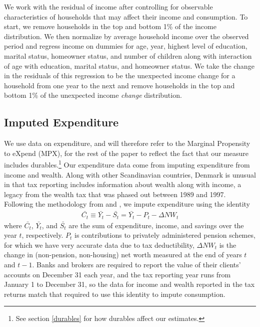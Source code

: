 \documentclass[titlepage]{\econtex}\newcommand{\texname}{ConsumptionHeterogeneity}
\begin{document}
	
	
	We work with the residual of income after controlling for observable characteristics of households that may affect their income and consumption. To start, we remove households in the top and bottom 1\% of the income distribution. We then normalize by average household income over the observed period and regress income on dummies for age, year, highest level of education, marital status, homeowner status, and number of children along with interaction of age with education, marital status, and homeowner status. We take the change in the residuals of this regression to be the unexpected income change for a household from one year to the next and remove households in the top and bottom 1\% of the unexpected income \textit{change} distribution.
	
	\subsection{Imputed Expenditure} \label{cons_imputation}
	We use data on expenditure, and will therefore refer to the Marginal Propensity to eXpend (MPX), for the rest of the paper to reflect the fact that our measure includes durables.\footnote{See section \ref{durables} for how durables affect our estimates.} Our expenditure data come from imputing expenditure from income and wealth. Along with other Scandinavian countries, Denmark is unusual in that tax reporting includes information about wealth along with income, a legacy from the wealth tax that was phased out between 1989 and 1997. Following the methodology from \cite{browning_imputing_2003} and \cite{fagereng_imputing_2015}, we impute expenditure using the identity
	\begin{align*}
	\bar{C_t} \equiv \bar{Y_t} - \bar{S_t} = \bar{Y_t} - P_t - \Delta NW_t 
	\end{align*}
	where $\bar{C_t}$, $\bar{Y_t}$, and $\bar{S_t}$  are the sum of expenditure, income, and savings over the year $t$, respectively. $P_t$ is contributions to privately administered pension schemes, for which we have very accurate data due to tax deductibility, $\Delta NW_t$ is the change in (non-pension, non-housing) net worth measured at the end of years $t$ and $t-1$. Banks and brokers are required to report the value of their clients' accounts on December 31 each year, and the tax reporting year runs from January 1 to December 31, so the data for income and wealth reported in the tax returns match that required to use this identity to impute consumption. 
	
\end{document}
